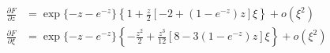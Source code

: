 {\color{red}
\begin{align*}
  \frac{\partial F}{\partial z}
  &= \exp\{ -z - e^{-z} \} \left\{ 1 + \frac{z}{2} \left[ -2 + (1 -e^{-z}) z \right] \xi \right\} + o(\xi^2) \\
  \frac{\partial F}{\partial \xi}
  &= \exp\{ -z - e^{-z} \}
    \left\{-\frac{z^2}{2}
    + \frac{z^3}{12} \left[8 - 3 (1 -e^{-z}) z \right] \xi \right\}
    + o(\xi^2)
\end{align*}
}




